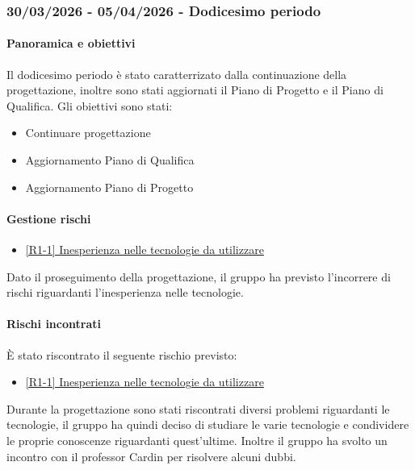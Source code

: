 \documentclass[a4paper,12pt]{article}
\begin{document}
        \subsubsection{30/03/2026 - 05/04/2026 - Dodicesimo periodo}
            \paragraph{Panoramica e obiettivi}
            Il dodicesimo periodo è stato caratterrizato dalla continuazione della progettazione, inoltre sono stati aggiornati il Piano di Progetto e il Piano di Qualifica. Gli obiettivi sono stati:
            \begin{itemize}
                \item Continuare progettazione
                \item Aggiornamento Piano di Qualifica
                \item Aggiornamento Piano di Progetto
            \end{itemize}
            
            \paragraph{Gestione rischi}
                \begin{itemize}
                \item\hyperref[tab:r1]{[R1-1] Inesperienza nelle tecnologie da utilizzare}
                \end{itemize}
                Dato il proseguimento della progettazione, il gruppo ha previsto l'incorrere di rischi riguardanti l'inesperienza nelle tecnologie.
    
                \paragraph*{Rischi incontrati}
                È stato riscontrato il seguente rischio previsto:
                \begin{itemize}
                    \item \hyperref[tab:r1]{[R1-1] Inesperienza nelle tecnologie da utilizzare}
                \end{itemize}
                Durante la progettazione sono stati riscontrati diversi problemi riguardanti le tecnologie, il gruppo ha quindi deciso di studiare le varie tecnologie e condividere le proprie conoscenze riguardanti quest'ultime.
                Inoltre il gruppo ha svolto un incontro con il professor Cardin per risolvere alcuni dubbi.
                
\end{document}
